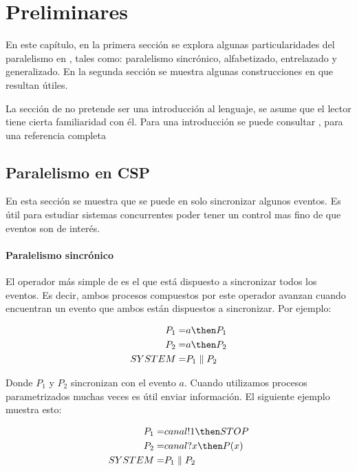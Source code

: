 \chapter{Preliminares}

En este capítulo, en la primera sección se explora algunas particularidades del paralelismo en \CSP, tales como: paralelismo sincrónico, alfabetizado, entrelazado y generalizado. En la segunda sección se muestra algunas construcciones en \CSPm que resultan útiles. 

La sección de \CSP no pretende ser una introducción al lenguaje, se asume que el lector tiene cierta familiaridad con él. Para una introducción se puede consultar \cite{Cristia:CSP}, para una referencia completa \cite{Roscoe:1997:TPC:550448}

\section{Paralelismo en CSP}

En esta sección se muestra que se puede en \CSP solo sincronizar algunos eventos. Es útil para estudiar sistemas concurrentes poder tener un control mas fino de que eventos son de interés. 

\subsubsection*{Paralelismo sincrónico}

El operador más simple de \CSP es el que está dispuesto a sincronizar todos los eventos. Es decir, ambos procesos compuestos por este operador avanzan cuando encuentran un evento que ambos están dispuestos a sincronizar. Por ejemplo:

\begin{align*}
P_1 =& a \then P_1\\
P_2 =& a \then P_2 \\
SYSTEM =& P_1 \parallel P_2
\end{align*}

Donde $P_1$ y $P_2$ sincronizan con el evento $a$. Cuando utilizamos procesos parametrizados muchas veces es útil enviar información. El siguiente ejemplo muestra esto:

\begin{align*}
P_1 =& canal!1 \then STOP \\
P_2 =& canal?x \then P(x) \\
SYSTEM =& P_1 \parallel P_2 \\
\end{align*}

